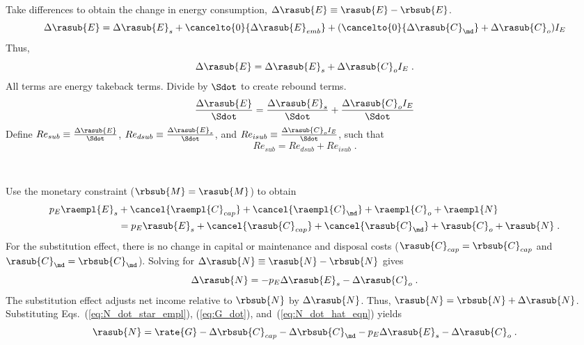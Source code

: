 \begin{landscape}
{Take differences to obtain the change in energy consumption, $\Delta \rasub{E} \equiv \rasub{E} - \rbsub{E}$.
%
\begin{equation}
  \Delta \rasub{E} = \Delta \rasub{E}_s 
                      + \cancelto{0}{\Delta \rasub{E}_{emb}} 
                      + (\cancelto{0}{\Delta \rasub{C}_{\md}} + \Delta \rasub{C}_o) I_E
\end{equation}
%
Thus, 
%
\begin{equation}
  \Delta \rasub{E} = \Delta \rasub{E}_s + \Delta \rasub{C}_o I_E \; .
\end{equation}
%
All terms are energy takeback terms.
Divide by $\Sdot$
to create rebound terms.
%
\begin{equation}
    \frac{\Delta \rasub{E}}{\Sdot} = \frac{\Delta \rasub{E}_s}{\Sdot} + \frac{\Delta \rasub{C}_o I_E}{\Sdot}
\end{equation}
%
Define 
$Re_{sub} \equiv \frac{\Delta \rasub{E}}{\Sdot}$, 
$Re_{dsub} \equiv \frac{\Delta \rasub{E}_s}{\Sdot}$, and
$Re_{isub} \equiv \frac{\Delta \rasub{C}_o I_E}{\Sdot}$,
such that
%
\begin{equation} \label{eq:Re_sub_def}
  Re_{sub} = Re_{dsub} + Re_{isub} \; .
\end{equation}

}
{
~
  
Use the monetary constraint ($\rbsub{M} = \rasub{M}$) to obtain
%
\begin{align}
  p_E \raempl{E}_s &+ \cancel{\raempl{C}_{cap}} + \cancel{\raempl{C}_{\md}} + \raempl{C}_o + \raempl{N} \nonumber \\
                   &= p_E \rasub{E}_s + \cancel{\rasub{C}_{cap}} + \cancel{\rasub{C}_{\md}} + \rasub{C}_o + \rasub{N} \; .
\end{align}
%
For the substitution effect, there is no change in capital or maintenance and disposal costs
($\rasub{C}_{cap} = \rbsub{C}_{cap}$ and $\rasub{C}_{\md} = \rbsub{C}_{\md}$).
Solving for $\Delta \rasub{N} \equiv \rasub{N} - \rbsub{N}$ gives
%
\begin{equation} \label{eq:N_dot_hat_eqn}
  \Delta \rasub{N} = - p_E \Delta \rasub{E}_s - \Delta \rasub{C}_o \; .
\end{equation}
%
The substitution effect adjusts net income relative to $\rbsub{N}$
by $\Delta \rasub{N}$.
Thus, $\rasub{N} = \rbsub{N} + \Delta \rasub{N}$.
Substituting Eqs.~(\ref{eq:N_dot_star_empl}), (\ref{eq:G_dot}), and~(\ref{eq:N_dot_hat_eqn})
yields
%
\begin{equation} \label{eq:N_dot_after_sub}
  \rasub{N} = \rate{G} - \Delta \rbsub{C}_{cap} - \Delta \rbsub{C}_{\md} - p_E \Delta \rasub{E}_s - \Delta \rasub{C}_o \; .
\end{equation}
%
}

\end{landscape}
